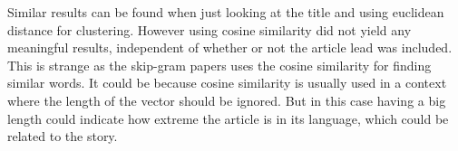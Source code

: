 Similar results can be found when just looking at the title and using euclidean distance for clustering. However using cosine similarity did not yield any meaningful results, independent of whether or not the article lead was included. This is strange as the skip-gram papers \cite{word2vec-comparing, word2vec-details} uses the cosine similarity for finding similar words. It could be because cosine similarity is usually used in a context where the length of the vector should be ignored. But in this case having a big length could indicate how extreme the article is in its language, which could be related to the story. 
